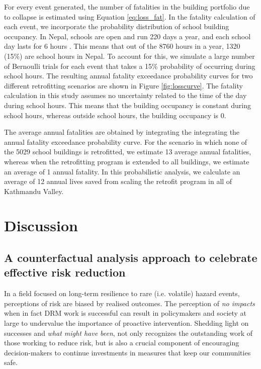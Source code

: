 \documentclass[utf8]{frontiersSCNS} %
\begin{document}
For every event generated, the number of fatalities in the building portfolio due to collapse is estimated using Equation \ref{eq:loss_fat}. In the fatality calculation of each event, we incorporate the probability distribution of school building occupancy. In Nepal, schools are open and run 220 days a year, and each school day lasts for 6 hours \citep{nepal2009reform}. This means that out of the 8760 hours in a year, 1320 (15\%) are school hours in Nepal. To account for this, we simulate a large number of Bernoulli trials for each event that takes a 15\% probability of occurring during school hours. The resulting annual fatality exceedance probability curves for two different retrofitting scenarios are shown in Figure \ref{fig:losscurve}. The fatality calculation in this study assumes no uncertainty related to the time of the day during school hours. This means that the building occupancy is constant during school hours, whereas outside school hours, the building occupancy is 0.

The average annual fatalities are obtained by integrating the integrating the annual fatality exceedance probability curve. For the scenario in which none of the 5029 school buildings is retrofitted, we estimate 13 average annual fatalities, whereas when the retrofitting program is extended to all buildings, we estimate an average of 1 annual fatality. In this probabilistic analysis, we calculate an average of 12 annual lives saved from scaling the retrofit program in all of Kathmandu Valley.
\section{Discussion}
\label{section-discussion}

\subsection{A counterfactual analysis approach to celebrate effective risk reduction}

In a field focused on long-term resilience to rare (i.e. volatile) hazard events, perceptions of risk are biased by realised outcomes. The perception of \textit{no impacts} when in fact DRM work is successful can result in policymakers and society at large to undervalue the importance of proactive intervention. Shedding light on successes and \textit{what might have been}, not only recognizes the outstanding work of those working to reduce risk, but is also a crucial component of encouraging decision-makers to continue investments in measures that keep our communities safe. 
\end{document}
